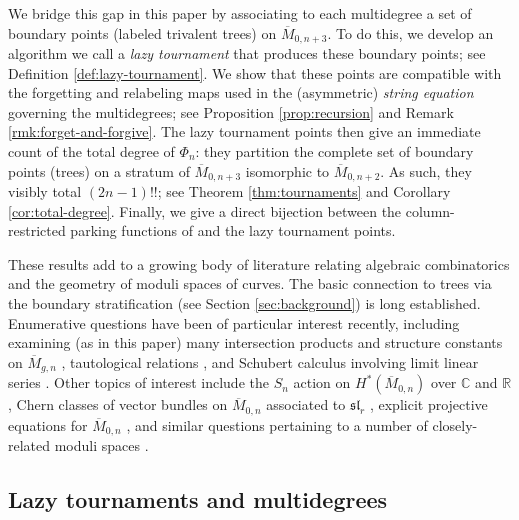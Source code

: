 \documentclass[11pt]{amsart}
\newcommand{\Mbar}{\overline{M}}
\newcommand{\emb}{\Phi}
\numberwithin{thm}{section}
\numberwithin{equation}{section}
\numberwithin{figure}{section}
\theoremstyle{definition}
\begin{document}
We bridge this gap in this paper by associating to each multidegree a set of boundary points (labeled trivalent trees) on $\Mbar_{0,n+3}$. To do this, we develop an algorithm we call a \emph{lazy tournament} that produces these boundary points; see Definition \ref{def:lazy-tournament}. We show that these points are compatible with the forgetting and relabeling maps used in the (asymmetric) \emph{string equation} \cite{CGM} governing the multidegrees; see Proposition \ref{prop:recursion} and Remark \ref{rmk:forget-and-forgive}. The lazy tournament points then give an immediate count of the total degree of $\emb_n$: they partition the complete set of boundary points (trees) on a stratum of $\Mbar_{0,n+3}$ isomorphic to $\Mbar_{0,n+2}$. As such, they visibly total $(2n-1)!!$; see Theorem \ref{thm:tournaments} and Corollary \ref{cor:total-degree}.  Finally, we give a direct bijection between the column-restricted parking functions of \cite{CGM} and the lazy tournament points.

These results add to a growing body of literature relating algebraic combinatorics and the geometry of moduli spaces of curves. The basic connection to trees via the boundary stratification (see Section \ref{sec:background}) is long established. Enumerative questions have been of particular interest recently, including examining (as in this paper) many intersection products and structure constants on $\Mbar_{g,n}$ \cite{canning2021chow, silversmith2021crossratio}, tautological relations \cite{CladerJanda, pandharipande2020relations, PixtonThesis}, and Schubert calculus involving limit linear series \cite{chan-pflueger, eisenbud-harris-limit-linear}. Other topics of interest include the $S_n$ action on $H^*(\Mbar_{0,n})$ over $\mathbb{C}$ \cite{BergstromMinabe, Getzler, RaSil2020} and $\mathbb{R}$ \cite{Rains}, Chern classes of vector bundles on $\Mbar_{0,n}$ associated to $\mathfrak{sl}_r$ \cite{damiolini2020vertex, gibneykeelmorrison2002}, explicit projective equations for $\Mbar_{0,n}$ \cite{MonRan}, and similar questions pertaining to a number of closely-related moduli spaces \cite{clader2021permutohedral, clader2020boundary, fry2019tropical, larson2020global, sharma2019intersections}.

\subsection{Lazy tournaments and multidegrees}
\end{document}
